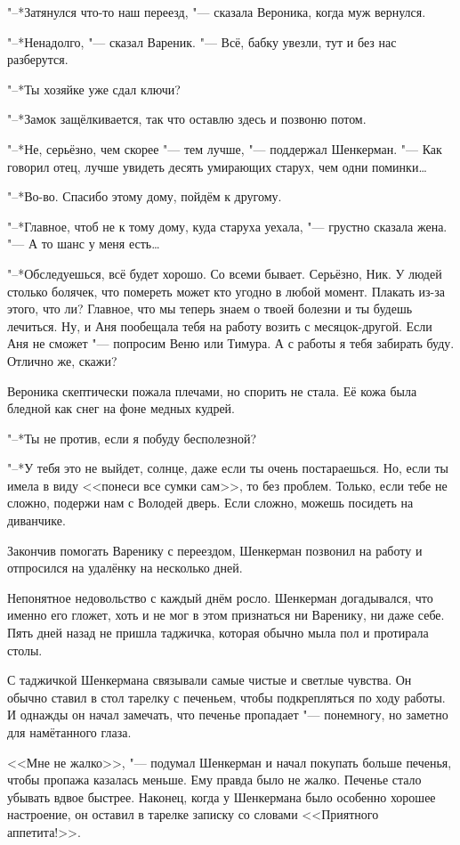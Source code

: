 "--*Затянулся что-то наш переезд, "--- сказала Вероника, когда муж вернулся.

"--*Ненадолго, "--- сказал Вареник.
"--- Всё, бабку увезли, тут и без нас разберутся.

"--*Ты хозяйке уже сдал ключи?

"--*Замок защёлкивается, так что оставлю здесь и позвоню потом.

"--*Не, серьёзно, чем скорее "--- тем лучше, "--- поддержал Шенкерман.
"--- Как говорил отец, лучше увидеть десять умирающих старух, чем одни поминки\dots{}

"--*Во-во.
Спасибо этому дому, пойдём к другому.

"--*Главное, чтоб не к тому дому, куда старуха уехала, "--- грустно сказала жена.
"--- А то шанс у меня есть\dots{}

"--*Обследуешься, всё будет хорошо.
Со всеми бывает.
Серьёзно, Ник.
У людей столько болячек, что помереть может кто угодно в любой момент.
Плакать из-за этого, что ли?
Главное, что мы теперь знаем о твоей болезни и ты будешь лечиться.
Ну, и Аня пообещала тебя на работу возить с месяцок-другой.
Если Аня не сможет "--- попросим Веню или Тимура.
А с работы я тебя забирать буду.
Отлично же, скажи?

Вероника скептически пожала плечами, но спорить не стала.
Её кожа была бледной как снег на фоне медных кудрей.

"--*Ты не против, если я побуду бесполезной?

"--*У тебя это не выйдет, солнце, даже если ты очень постараешься.
Но, если ты имела в виду <<понеси все сумки сам>>, то без проблем.
Только, если тебе не сложно, подержи нам с Володей дверь.
Если сложно, можешь посидеть на диванчике.

\asterism

Закончив помогать Варенику с переездом, Шенкерман позвонил на работу и отпросился на удалёнку на несколько дней.

Непонятное недовольство с каждый днём росло.
Шенкерман догадывался, что именно его гложет, хоть и не мог в этом признаться ни Варенику, ни даже себе.
Пять дней назад не пришла таджичка, которая обычно мыла пол и протирала столы.

С таджичкой Шенкермана связывали самые чистые и светлые чувства.
Он обычно ставил в стол тарелку с печеньем, чтобы подкрепляться по ходу работы.
И однажды он начал замечать, что печенье пропадает "--- понемногу, но заметно для намётанного глаза.

<<Мне не жалко>>, "--- подумал Шенкерман и начал покупать больше печенья, чтобы пропажа казалась меньше.
Ему правда было не жалко.
Печенье стало убывать вдвое быстрее.
Наконец, когда у Шенкермана было особенно хорошее настроение, он оставил в тарелке записку со словами <<Приятного аппетита!>>.

